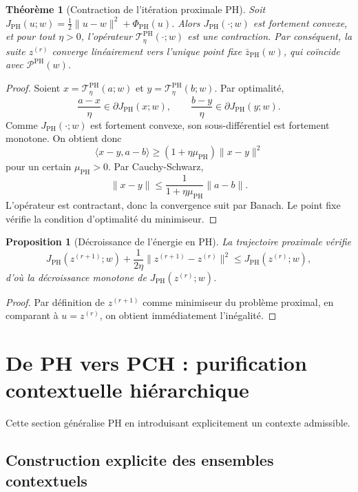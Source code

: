 \documentclass[11pt,a4paper]{article}
\newtheorem{proposition}{Proposition}[section]
\newtheorem{theorem}{Théorème}[section]
\newcommand{\Pcal}{\mathcal P}
\newcommand{\1}{\mathbf 1}
\begin{document}
\begin{theorem}[Contraction de l'itération proximale PH]
Soit \(J_{\mathrm{PH}}(u;w)=\frac12\|u-w\|^2+\Phi_{\mathrm{PH}}(u)\).  
Alors \(J_{\mathrm{PH}}(\cdot;w)\) est fortement convexe, et pour tout \(\eta>0\), l'opérateur \(\mathcal T^{\mathrm{PH}}_{\eta}(\cdot;w)\) est une contraction.  
Par conséquent, la suite \(z^{(r)}\) converge linéairement vers l'unique point fixe \(\bar z_{\mathrm{PH}}(w)\), qui coïncide avec \(\Pcal^{\mathrm{PH}}(w)\).
\end{theorem}

\begin{proof}
Soient \(x=\mathcal T^{\mathrm{PH}}_{\eta}(a;w)\) et \(y=\mathcal T^{\mathrm{PH}}_{\eta}(b;w)\).  
Par optimalité,
\[
\frac{a-x}{\eta}\in \partial J_{\mathrm{PH}}(x;w),
\qquad
\frac{b-y}{\eta}\in \partial J_{\mathrm{PH}}(y;w).
\]
Comme \(J_{\mathrm{PH}}(\cdot;w)\) est fortement convexe, son sous-différentiel est fortement monotone.  
On obtient donc
\[
\langle x-y,a-b\rangle\ge (1+\eta\mu_{\mathrm{PH}})\|x-y\|^2
\]
pour un certain \(\mu_{\mathrm{PH}}>0\).  
Par Cauchy-Schwarz,
\[
\|x-y\|\le \frac{1}{1+\eta\mu_{\mathrm{PH}}}\|a-b\|.
\]
L'opérateur est contractant, donc la convergence suit par Banach.  
Le point fixe vérifie la condition d'optimalité du minimiseur.
\end{proof}

\begin{proposition}[Décroissance de l'énergie en PH]
La trajectoire proximale vérifie
\[
J_{\mathrm{PH}}(z^{(r+1)};w)
+
\frac{1}{2\eta}\|z^{(r+1)}-z^{(r)}\|^2
\le
J_{\mathrm{PH}}(z^{(r)};w),
\]
d'où la décroissance monotone de \(J_{\mathrm{PH}}(z^{(r)};w)\).
\end{proposition}

\begin{proof}
Par définition de \(z^{(r+1)}\) comme minimiseur du problème proximal, en comparant à \(u=z^{(r)}\), on obtient immédiatement l'inégalité.
\end{proof}

\section{De PH vers PCH : purification contextuelle hiérarchique}

Cette section généralise PH en introduisant explicitement un contexte admissible.

\subsection{Construction explicite des ensembles contextuels}
\end{document}
